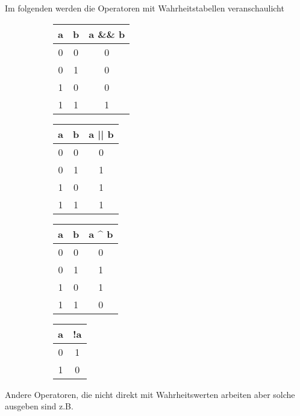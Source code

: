 \documentclass[c_worksheet.tex]{subfiles}
\begin{document}
Im folgenden werden die Operatoren mit Wahrheitstabellen veranschaulicht

\begin{figure}[H]
\begin{center}
\begin{subfigure}[b]{0.2\textwidth}
\centering
\begin{tabular}{ c | c | c }
a & b & a \&\& b \\
\hline
\hline
0 & 0 & 0 \\
\hline
0 & 1 & 0 \\
\hline
1 & 0 & 0 \\
\hline
1 & 1 & 1 \\
\end{tabular}
\end{subfigure}
\begin{subfigure}[b]{0.2\textwidth}
\centering
\begin{tabular}{ c | c | c }
a & b & a || b \\
\hline
\hline
0 & 0 & 0 \\
\hline
0 & 1 & 1 \\
\hline
1 & 0 & 1 \\
\hline
1 & 1 & 1 \\
\end{tabular}
\end{subfigure}
\begin{subfigure}[b]{0.2\textwidth}
\centering
\begin{tabular}{ c | c | c }
a & b & a \^{} b \\
\hline
\hline
0 & 0 & 0 \\
\hline
0 & 1 & 1 \\
\hline
1 & 0 & 1 \\
\hline
1 & 1 & 0 \\
\end{tabular}
\end{subfigure}
\begin{subfigure}[b]{0.2\textwidth}
\centering
\begin{tabular}{ c | c }
a & !a \\
\hline
\hline
0 & 1 \\
\hline
1 & 0 \\
\end{tabular}
\end{subfigure}
\end{center}
\end{figure}


Andere Operatoren, die nicht direkt mit Wahrheitswerten arbeiten aber solche ausgeben sind z.B.
\end{document}
